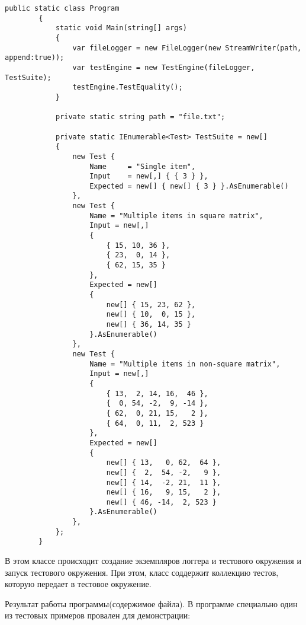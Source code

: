 \documentclass[a4paper,14pt]{extarticle}
\begin{document}
    \begin{lstlisting}[language={[Sharp]C}]
        public static class Program
        {
            static void Main(string[] args)
            {
                var fileLogger = new FileLogger(new StreamWriter(path, append:true));
                var testEngine = new TestEngine(fileLogger, TestSuite);
                testEngine.TestEquality();
            }

            private static string path = "file.txt";

            private static IEnumerable<Test> TestSuite = new[]
            {
                new Test {
                    Name     = "Single item",
                    Input    = new[,] { { 3 } },
                    Expected = new[] { new[] { 3 } }.AsEnumerable()
                },
                new Test {
                    Name = "Multiple items in square matrix",
                    Input = new[,]
                    {
                        { 15, 10, 36 },
                        { 23,  0, 14 },
                        { 62, 15, 35 }
                    },
                    Expected = new[]
                    {
                        new[] { 15, 23, 62 },
                        new[] { 10,  0, 15 },
                        new[] { 36, 14, 35 }
                    }.AsEnumerable()
                },
                new Test {
                    Name = "Multiple items in non-square matrix",
                    Input = new[,]
                    {
                        { 13,  2, 14, 16,  46 },
                        {  0, 54, -2,  9, -14 },
                        { 62,  0, 21, 15,   2 },
                        { 64,  0, 11,  2, 523 }
                    },
                    Expected = new[]
                    {
                        new[] { 13,   0, 62,  64 },
                        new[] {  2,  54, -2,   9 },
                        new[] { 14,  -2, 21,  11 },
                        new[] { 16,   9, 15,   2 },
                        new[] { 46, -14,  2, 523 }
                    }.AsEnumerable()
                },
            };
        }
    \end{lstlisting}

    В этом классе происходит создание экземпляров логгера и тестового окружения
    и запуск тестового окружения. При этом, класс соддержит коллекцию тестов,
    которую передает в тестовое окружение. 

    Результат работы программы(содержимое файла). В программе специально один из 
    тестовых примеров провален для демонстрации:
\end{document}
